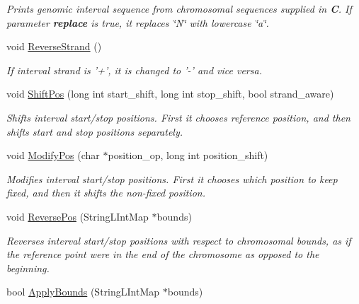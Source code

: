 \begin{CompactItemize}
\begin{CompactList}\small\item\em Prints genomic interval sequence from chromosomal sequences supplied in {\bf C}. If parameter {\bf replace} is true, it replaces \char`\"{}N\char`\"{} with lowercase \char`\"{}a\char`\"{}. \item\end{CompactList}\item 
\hypertarget{classGenomicInterval_a410816fa04d76edd7caeb9ae2442ae1}{
void \hyperlink{classGenomicInterval_a410816fa04d76edd7caeb9ae2442ae1}{ReverseStrand} ()}
\label{classGenomicInterval_a410816fa04d76edd7caeb9ae2442ae1}

\begin{CompactList}\small\item\em If interval strand is '+', it is changed to '-' and vice versa. \item\end{CompactList}\item 
void \hyperlink{classGenomicInterval_ac9a744d5ecd181d6ddc9b7e47605a59}{ShiftPos} (long int start\_\-shift, long int stop\_\-shift, bool strand\_\-aware)
\begin{CompactList}\small\item\em Shifts interval start/stop positions. First it chooses reference position, and then shifts start and stop positions separately. \item\end{CompactList}\item 
void \hyperlink{classGenomicInterval_96b34b76019001c4751d4c4f868ee24d}{ModifyPos} (char $\ast$position\_\-op, long int position\_\-shift)
\begin{CompactList}\small\item\em Modifies interval start/stop positions. First it chooses which position to keep fixed, and then it shifts the non-fixed position. \item\end{CompactList}\item 
\hypertarget{classGenomicInterval_bf416450f25b579dfb76b2bd6a81aa6a}{
void \hyperlink{classGenomicInterval_bf416450f25b579dfb76b2bd6a81aa6a}{ReversePos} (StringLIntMap $\ast$bounds)}
\label{classGenomicInterval_bf416450f25b579dfb76b2bd6a81aa6a}

\begin{CompactList}\small\item\em Reverses interval start/stop positions with respect to chromosomal bounds, as if the reference point were in the end of the chromosome as opposed to the beginning. \item\end{CompactList}\item 
\hypertarget{classGenomicInterval_3b49ca0f99d27ddadcfd96791cf77b89}{
bool \hyperlink{classGenomicInterval_3b49ca0f99d27ddadcfd96791cf77b89}{ApplyBounds} (StringLIntMap $\ast$bounds)}
\label{classGenomicInterval_3b49ca0f99d27ddadcfd96791cf77b89}


\end{CompactItemize}
